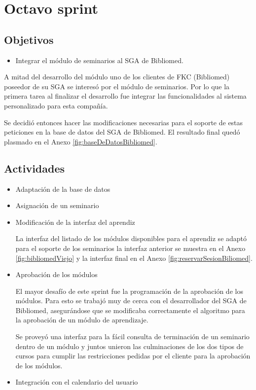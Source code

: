 \section{Octavo sprint} %
\label{sec:octavo_sprint}

\subsection{Objetivos}

\begin{itemize}
	\item Integrar el módulo de seminarios al SGA de Bibliomed.
\end{itemize}

A mitad del desarrollo del módulo uno de los clientes de FKC (Bibliomed) poseedor de su SGA se interesó por el módulo de seminarios. Por lo que la primera tarea al finalizar el desarrollo fue integrar las funcionalidades al sistema personalizado para esta compañía.

Se decidió entonces hacer las modificaciones necesarias para el soporte de estas peticiones en la base de datos del SGA de Bibliomed. El resultado final quedó plasmado en el Anexo \ref{fig:baseDeDatosBibliomed}.

\subsection{Actividades} %
\label{sub:actividades8}

\begin{itemize}

\item Adaptación de la base de datos

\item Asignación de un seminario

\item Modificación de la interfaz del aprendiz

La interfaz del listado de los módulos disponibles para el aprendiz se adaptó para el soporte de los seminarios la interfaz anterior se muestra en el Anexo \ref{fig:bibliomedViejo} y la interfaz final en el Anexo \ref{fig:reservarSesionBiliomed}.

\item Aprobación de los módulos

El mayor desafío de este sprint fue la programación de la aprobación de los módulos. Para esto se trabajó muy de cerca con el desarrollador del SGA de Bibliomed, asegurándose que se modificaba correctamente el algoritmo para la aprobación de un módulo de aprendizaje.

Se proveyó una interfaz para la fácil consulta de terminación de un seminario dentro de un módulo y juntos unieron las culminaciones de los dos tipos de cursos para cumplir las restricciones pedidas por el cliente para la aprobación de los módulos.

\item Integración con el calendario del usuario

\end{itemize}


